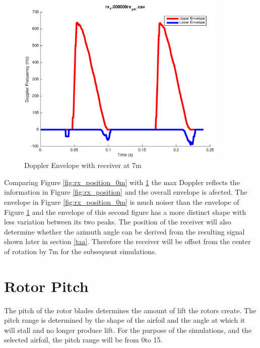 \begin{figure}
	\begin{center}
		\includegraphics[width=10cm]{images/simulation/Doppler_Receiver_7m.eps}
		\caption{Doppler Envelope with receiver at 7m}
		\label{fig:rx_position_7m}
	\end{center}
\end{figure}

Comparing Figure \ref{fig:rx_position_0m} with \ref{fig:rx_position_7m} the max Doppler reflects the information in Figure \ref{fig:rx_position} and the overall envelope is afected. The envelope in Figure \ref{fig:rx_position_0m} is much noiser than the envelope of Figure \ref{fig:rx_position_7m} and the envelope of this second figure has a more distinct shape with less variation between its two peaks. The position of the receiver will also determine whether the azimuth angle can be derived from the resulting signal shown later in section \ref{taa}. Therefore the receiver will be offset from the center of rotation by 7m for the subsequent simulations.


\section{Rotor Pitch}
The pitch of the rotor blades determines the amount of lift the rotors create. The pitch range is determined by the shape of the airfoil and the angle at which it will stall and no longer produce lift. For the purpose of the simulations, and the selected airfoil, the pitch range will be from 0\textdegree  \space to 15\textdegree.

